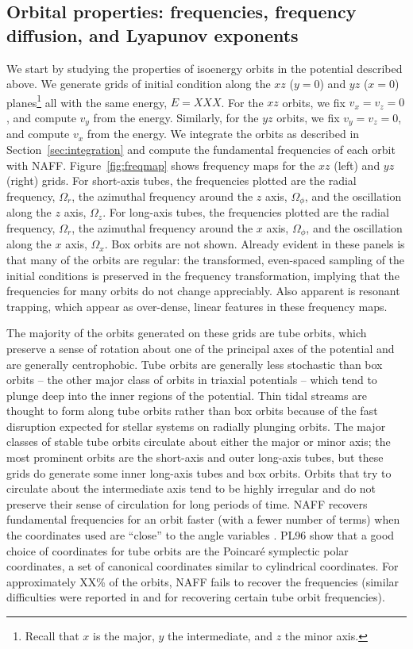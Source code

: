 \documentclass[letterpaper,12pt,preprint]{aastex}
\begin{document}
\subsection{Orbital properties: frequencies, frequency diffusion, and Lyapunov exponents}

We start by studying the properties of isoenergy orbits in the potential described above. We generate grids of initial condition along the $xz$ ($y=0$) and $yz$ ($x=0$) planes\footnote{Recall that $x$ is the major, $y$ the intermediate, and $z$ the minor axis.} all with the same energy, $E=XXX$. For the $xz$ orbits, we fix $v_x = v_z = 0$, and compute $v_y$ from the energy. Similarly, for the $yz$ orbits, we fix $v_y = v_z = 0$, and compute $v_x$ from the energy. We integrate the orbits as described in Section~\ref{sec:integration} and compute the fundamental frequencies of each orbit with NAFF. Figure~\ref{fig:freqmap} shows frequency maps for the $xz$ (left) and $yz$ (right) grids. For short-axis tubes, the frequencies plotted are the radial frequency, $\Omega_r$, the azimuthal frequency around the $z$ axis, $\Omega_\phi$, and the oscillation along the $z$ axis, $\Omega_z$. For long-axis tubes, the frequencies plotted are the radial frequency, $\Omega_r$, the azimuthal frequency around the $x$ axis, $\Omega_\phi$, and the oscillation along the $x$ axis, $\Omega_x$. Box orbits are not shown. Already evident in these panels is that many of the orbits are regular: the transformed, even-spaced sampling of the initial conditions is preserved in the frequency transformation, implying that the frequencies for many orbits do not change appreciably. Also apparent is resonant trapping,  which appear as over-dense, linear features in these frequency maps. 

The majority of the orbits generated on these grids are tube orbits, which preserve a sense of rotation about one of the principal axes of the potential and are generally centrophobic. Tube orbits are generally less stochastic than box orbits -- the other major class of orbits in triaxial potentials -- which tend to plunge deep into the inner regions of the potential. Thin tidal streams are thought to form along tube orbits rather than box orbits because of the fast disruption expected for stellar systems on radially plunging orbits. The major classes of stable tube orbits circulate about either the major or minor axis; the most prominent orbits are the short-axis and outer long-axis tubes, but these grids do generate some inner long-axis tubes and box orbits. Orbits that try to circulate about the intermediate axis tend to be highly irregular and do not preserve their sense of circulation for long periods of time. NAFF recovers fundamental frequencies for an orbit faster (with a fewer number of terms) when the coordinates used are ``close'' to the angle variables \cite[PL95][]{papaphillippou96}. PL96 show that a good choice of coordinates for tube orbits are the Poincar\'e symplectic polar coordinates, a set of canonical coordinates similar to cylindrical coordinates. For approximately XX\% of the orbits, NAFF fails to recover the frequencies (similar difficulties were reported in \cite{valluri98} and \cite{papaphillippou96} for recovering certain tube orbit frequencies).
\end{document}
